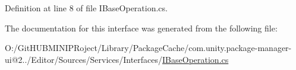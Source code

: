 Definition at line 8 of file I\+Base\+Operation.\+cs.



The documentation for this interface was generated from the following file\+:\begin{DoxyCompactItemize}
\item 
O\+:/\+Git\+H\+U\+B\+M\+I\+N\+I\+P\+Roject/\+Library/\+Package\+Cache/com.\+unity.\+package-\/manager-\/ui@2../\+Editor/\+Sources/\+Services/\+Interfaces/\mbox{\hyperlink{_i_base_operation_8cs}{I\+Base\+Operation.\+cs}}\end{DoxyCompactItemize}
